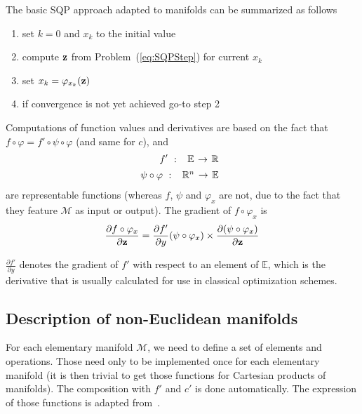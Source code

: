 The basic SQP approach adapted to manifolds can be summarized as follows
\begin{enumerate}
	\item set $k=0$ and $x_k$ to the initial value
  \item compute ${\bf z}$ from Problem~(\ref{eq:SQPStep}) for current $x_k$
  \item set $x_k = \varphi_{x_k}({\bf z})$
	\item if convergence is not yet achieved go-to step 2
\end{enumerate}

Computations of function values and derivatives are based on the fact that $f \circ \varphi = f' \circ \psi \circ \varphi$ (and same for $c$), and
\begin{align}
  f'\ :\
  \begin{array}{ccc}
    \mathbb{E} & \reduce{\rightarrow}{6} & \mathbb{R}
  \end{array} \nonumber \\
	\psi \circ \varphi\ :\
  \begin{array}{ccc}
    \mathbb{R}^n & \reduce{\rightarrow}{6} & \mathbb{E}
  \end{array} \nonumber
\end{align}
are representable functions (whereas $f$, $\psi$ and $\varphi_x$ are not, due to the fact that they feature $\mathcal{M}$ as input or output).
The gradient of $f \circ \varphi_x$ is
\begin{align}
  \frac{\partial f\circ\varphi_x}{\partial {\bf z}}=
  \frac{\partial f'}{\partial y}(\psi\circ\varphi_x)\times
  \frac{\partial (\psi\circ\varphi_x)}{\partial {\bf z}}
\end{align}

$\frac{\partial f'}{\partial y}$ denotes the gradient of $f'$ with respect to an element of $\mathbb{E}$, which is the derivative that is usually calculated for use in classical optimization schemes.

\subsection{Description of non-Euclidean manifolds}
\label{sub:examples_on_non_euclidean_manifolds}

For each elementary manifold $\mathcal{M}$, we need to define a set of elements and operations.
Those need only to be implemented once for each elementary manifold (it is then trivial to get those functions for Cartesian products of manifolds).
The composition with $f'$ and $c'$ is done automatically.
The expression of those functions is adapted from~\cite{boumal:jmlr:2014}.

